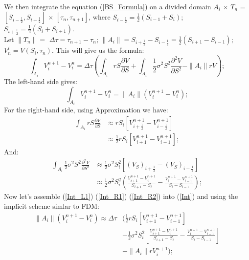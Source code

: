 \documentclass[final]{siamltex}
\begin{document}
We then integrate the equation (\ref{BS_Formula}) on a divided domain $ A_i$ $ \times$ $T_n$ = $[S_{i-\frac{1}{2}},S_{i+\frac{1}{2}}]$ $\times$ $[\tau_n , \tau_{n+1}]$, where $S_{i-\frac{1}{2}}= \frac{1}{2} (S_{i-1}+S_{i})$; $S_{i+\frac{1}{2}}=\frac{1}{2} (S_{i}+S_{i+1})$. \\
Let $\|T_n\|=$ $\Delta \tau=\tau_{n+1}-\tau_{n}$; $\|A_i\|= S_{i+\frac{1}{2}}-S_{i-\frac{1}{2}}= \frac{1}{2}(S_{i+1}-S_{i-1})$; $V_n^i=V(S _i, \tau _n)$. This will give us the formula:
\begin{equation}
\int _{A_i} V_i^{n+1}- V_i^{n}= \Delta \tau (\int _{A_i} rS \frac{\partial V}{\partial S}+ \int _{A_i} \frac{1}{2} \sigma ^2 S^2 \frac{\partial ^2 V}{\partial S ^2}- \|A_i\| rV);
\label{Int}
\end{equation}
The left-hand side gives:
\begin{equation}
\int _{A_i} V_i^{n+1}- V_i^{n}=\|A_i\|(V_i^{n+1}- V_i^{n});
\label{Int_L1}
\end{equation}
For the right-hand side, using Approximation we have:
\begin{equation}
\begin{split}
\int _{A_i} rS \frac{\partial V}{\partial S}
&\approx rS_i[V^{n+1}_{i+\frac{1}{2}}-V^{n+1}_{i-\frac{1}{2}}]\\
&\approx \frac{1}{2}rS_i[V^{n+1}_{i+1}-V^{n+1}_{i-1}];
\end{split}
\label{Int_R1}
\end{equation}
And:
\begin{equation}
\begin{split}
\int _{A_i} \frac{1}{2} \sigma ^2 S^2 \frac{\partial ^2 V}{\partial S ^2}
&\approx \frac{1}{2} \sigma ^2 S_i^2 [(V_S)_{i+\frac{1}{2}}
-(V_S)_{i-\frac{1}{2}}] \\
&\approx \frac{1}{2} \sigma ^2 S_i^2 (\frac{V^{n+1}_{i+1}-V^{n+1}_i}{S_{i+1}-S_i} - \frac{V^{n+1}_{i}-V^{n+1}_{i-1}}{S_{i}-S_{i-1}});
\end{split}
\label{Int_R2}
\end{equation}
Now let's assemble (\ref{Int_L1}) (\ref{Int_R1}) (\ref{Int_R2}) into (\ref{Int}) and using the implicit scheme simlar to FDM:
\begin{equation}
\begin{split}
\|A_i\|(V_i^{n+1}- V_i^{n}) \approx  \Delta \tau &(\frac{1}{2}rS_i[V^{n+1}_{i+1}-V^{n+1}_{i-1}]\\
& +\frac{1}{2} \sigma ^2 S_i^2 [\frac{V^{n+1}_{i+1}-V^{n+1}_i}{S_{i+1}-S_i} 
- \frac{V^{n+1}_{i}-V^{n+1}_{i-1}}{S_{i}-S_{i-1}}] \\
& - \|A_i\| rV_i^{n+1});
\end{split}
\label{FVM_BS}
\end{equation}
\end{document}

